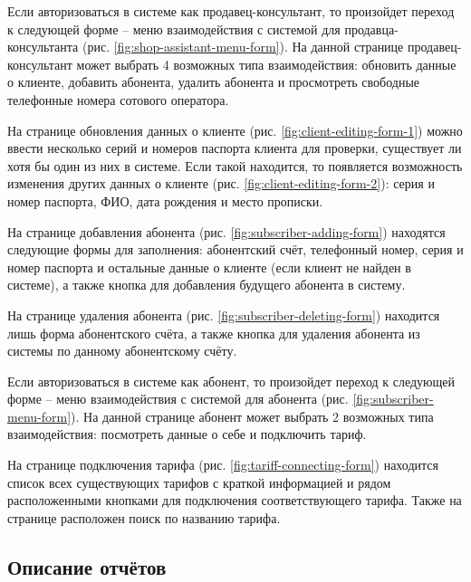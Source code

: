 Если авторизоваться в системе как продавец-консультант, то произойдет переход к следующей форме -- меню взаимодействия с системой для продавца-консультанта (рис. \ref{fig:shop-assistant-menu-form}). На данной странице продавец-консультант может выбрать 4 возможных типа взаимодействия: обновить данные о клиенте, добавить абонента, удалить абонента и просмотреть свободные телефонные номера сотового оператора.

На странице обновления данных о клиенте (рис. \ref{fig:client-editing-form-1}) можно ввести несколько серий и номеров паспорта клиента для проверки, существует ли хотя бы один из них в системе. Если такой находится, то появляется возможность изменения других данных о клиенте (рис. \ref{fig:client-editing-form-2}): серия и номер паспорта, ФИО, дата рождения и место прописки.

На странице добавления абонента (рис. \ref{fig:subscriber-adding-form}) находятся следующие формы для заполнения: абонентский счёт, телефонный номер, серия и номер паспорта и остальные данные о клиенте (если клиент не найден в системе), а также кнопка для добавления будущего абонента в систему.

На странице удаления абонента (рис. \ref{fig:subscriber-deleting-form}) находится лишь форма абонентского счёта, а также кнопка для удаления абонента из системы по данному абонентскому счёту.

Если авторизоваться в системе как абонент, то произойдет переход к следующей форме -- меню взаимодействия с системой для абонента (рис. \ref{fig:subscriber-menu-form}). На данной странице абонент может выбрать 2 возможных типа взаимодействия: посмотреть данные о себе и подключить тариф.

На странице подключения тарифа (рис. \ref{fig:tariff-connecting-form}) находится список всех существующих тарифов с краткой информацией и рядом расположенными кнопками для подключения соответствующего тарифа. Также на странице расположен поиск по названию тарифа.


\subsection{Описание отчётов}

